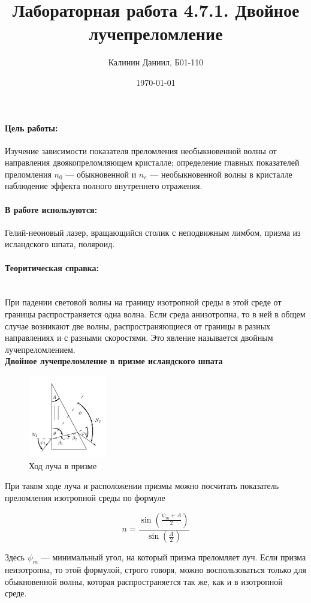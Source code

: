 \documentclass[a4paper, 12pt]{article}
\author{Калинин Даниил, Б01-110}
\date{\today}
\title{Лабораторная работа 4.7.1. Двойное лучепреломление}
\newcommand{\parag}[1]{\paragraph*{#1:}}
\begin{document}
\maketitle
\parindent=0cm

\parag {Цель работы}
Изучение зависимости показателя преломления необыкновенной волны от направления двоякопреломляющем кристалле; определение главных показателей преломления $n_0$ --- обыкновенной и $n_e$ --- необыкновенной волны в кристалле наблюдение эффекта полного внутреннего отражения.

\parag {В работе используются}
Гелий-неоновый лазер, вращающийся столик с неподвижным лимбом, призма из исландского шпата, поляроид.

\parag {Теоритическая справка} ~\\

При падении световой волны на границу изотропной среды в этой среде от границы распространяется одна волна. Если среда анизотропна, то в ней в общем случае возникают две волны, распространяющиеся от границы в разных направлениях и с разными скоростями. Это явление называется двойным лучепреломлением.~\\

\textbf{Двойное лучепреломление в призме исландского шпата}~\\

    \begin{figure}
        \begin{center}
        \includegraphics[width = 0.3\textwidth]{light_way.png}
        \end{center}
        \caption{Ход луча в призме}
    \end{figure}
    При таком ходе луча и расположении призмы можно посчитать показатель преломления изотропной среды по формуле

    \begin{equation*}
        n = \frac{\sin\left(\frac{\psi_m + A}{2}\right)}{\sin \left(\frac{A}{2}\right)}
    \end{equation*}
    
    Здесь $\psi_m$  --- минимальный угол, на который призма преломляет луч.
    Если призма неизотропна, то этой формулой, строго говоря, можно воспользоваться только для обыкновенной волны, которая распространяется так же, как и в изотропной среде. 
    
\end{document}
